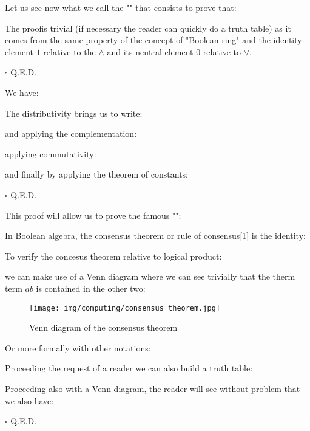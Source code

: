 	\begin{theorem}
	Let us see now what we call the "" that consists to prove that:
	
	\end{theorem}
	\begin{dem}
	The proofis trivial (if necessary the reader can quickly do a truth table) as it comes from the same property of the concept of "Boolean ring" and the identity element $1$ relative to the $\wedge$ and its neutral element $0$ relative to $\vee$.
	\begin{flushright}
		$\square$  Q.E.D.
	\end{flushright}
	\end{dem}
	\begin{theorem}
	We have:
	
	\end{theorem}
	\begin{dem}
	The distributivity brings us to write:
	
	and applying the complementation:
	
	applying commutativity:
	
	and finally by applying the theorem of constants:
	
	\begin{flushright}
		$\square$  Q.E.D.
	\end{flushright}
	\end{dem}
	This proof will allow us to prove  the famous "":
	\begin{theorem}
	In Boolean algebra, the consensus theorem or rule of consensus[1] is the identity:
	
	\end{theorem}
	\begin{dem}
	To verify the concesus theorem relative to logical product:
	
	we can make use of a Venn diagram where we can see trivially that the therm term $ab$ is contained in the other two:
	\begin{figure}[H]
		\centering
		\texttt{[image: img/computing/consensus\_theorem.jpg]}
		\caption{Venn diagram of the consensus theorem}
	\end{figure}
	Or more formally with other notations:
	
	Proceeding the request of a reader we can also build a truth table:
	
		
	Proceeding also with a Venn diagram, the reader will see without problem that we also have:
	
	
	\begin{flushright}
		$\square$  Q.E.D.
	\end{flushright}
	\end{dem}
